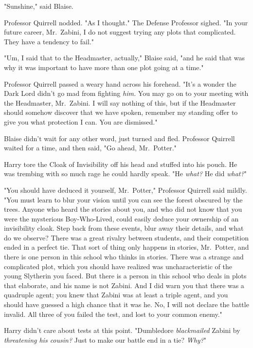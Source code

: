 "Sunshine," said Blaise.

Professor Quirrell nodded. "As I thought." The Defense Professor sighed. "In
your future career, Mr.~Zabini, I do not suggest trying any plots that
complicated. They have a tendency to fail."

"Um, I said that to the Headmaster, actually," Blaise said, "and he said that
was why it was important to have more than one plot going at a time."

Professor Quirrell passed a weary hand across his forehead. "It's a wonder the
Dark Lord didn't go mad from fighting \emph{him.} You may go on to your meeting
with the Headmaster, Mr.~Zabini. I will say nothing of this, but if the
Headmaster should somehow discover that we have spoken, remember my standing
offer to give you what protection I can. You are dismissed."

Blaise didn't wait for any other word, just turned and fled.
\later
Professor Quirrell waited for a time, and then said, "Go ahead, Mr.~Potter."

Harry tore the Cloak of Invisibility off his head and stuffed into his pouch.
He was trembing with so much rage he could hardly speak. "He \emph{what?} He
did \emph{what?}"

"You should have deduced it yourself, Mr.~Potter," Professor Quirrell said
mildly. "You must learn to blur your vision until you can see the forest
obscured by the trees. Anyone who heard the stories about you, and who did not
know that you were the mysterious Boy-Who-Lived, could easily deduce your
ownership of an invisibility cloak. Step back from these events, blur away
their details, and what do we observe? There was a great rivalry between
students, and their competition ended in a perfect tie. That sort of thing only
happens in stories, Mr.~Potter, and there is one person in this school who
thinks in stories. There was a strange and complicated plot, which you should
have realized was uncharacteristic of the young Slytherin you faced. But there
is a person in this school who deals in plots that elaborate, and his name is
not Zabini. And I did warn you that there was a quadruple agent; you knew that
Zabini was at least a triple agent, and you should have guessed a high chance
that it was he. No, I will not declare the battle invalid. All three of you
failed the test, and lost to your common enemy."

Harry didn't care about tests at this point. "Dumbledore \emph{blackmailed}
Zabini by \emph{threatening his cousin?} Just to make our battle end in a tie?
\emph{Why?}"

